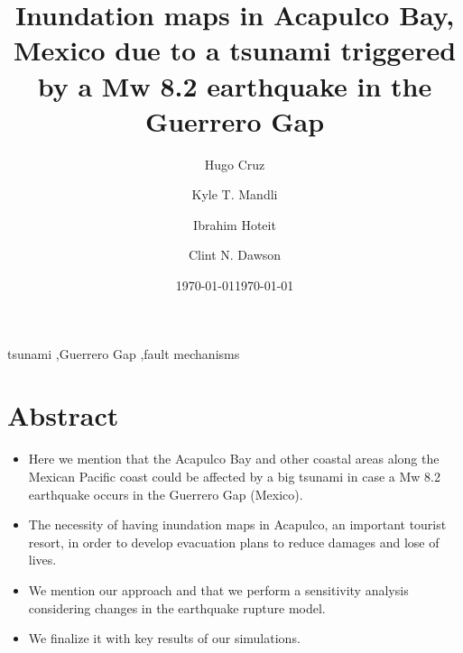 \documentclass[preprint,review,12pt]{elsarticle}
\begin{document}
\ifpdf
{}
\else
{}
\fi

\begin{frontmatter}

\title{Inundation maps in Acapulco Bay, Mexico due to a tsunami triggered by a Mw 8.2 earthquake in the Guerrero Gap}

\author[kaust1]{Hugo Cruz}
\author[ut]{Kyle T. Mandli}
\author[kaust1,kaust2]{Ibrahim Hoteit}
\author[ut]{Clint N. Dawson}


\date{\today}
\address[kaust1]{Division of Physical Sciences and Engineering, King Abdullah University of Science and Technology, Thuwal, Saudi Arabia}
\address[ut]{Institute for Computational Engineering and Science, University of Texas at Austin, 201 E 24th ST. Stop C0200, Austin, TX 78712-1229, USA}
\address[kaust2]{Division of Computer, Electrical and Mathematical Sciences and Engineering, King Abdullah University of Science and Technology, Thuwal, Saudi Arabia}

\date{\today}

\begin{abstract}

\end{abstract}

\begin{keyword}
tsunami \sep Guerrero Gap \sep fault mechanisms
\end{keyword}

\end{frontmatter}
\linenumbers


\section{Abstract}

\begin{itemize}
  \item Here we mention that the Acapulco Bay and other coastal areas along the Mexican Pacific coast could be affected by a big tsunami in case a Mw 8.2 earthquake occurs in the Guerrero Gap (Mexico). 
  \item The necessity of having inundation maps in Acapulco, an important tourist resort, in order to develop evacuation plans to reduce damages and lose of lives. 
  \item We mention our approach and that we perform a sensitivity analysis considering changes in the earthquake rupture model. 
  \item We finalize it with key results of our simulations.
\end{itemize}
\end{document}

